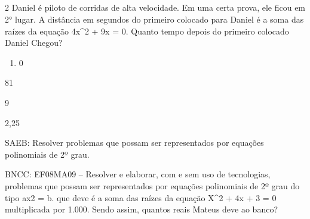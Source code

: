 \\
\\
\\
\\

% 
% 

\num{2} Daniel é piloto de corridas de alta velocidade. Em uma certa prova,
ele ficou em 2° lugar. A distância em segundos do primeiro colocado para
Daniel é a soma das raízes da equação 4x^2 + 9x = 0. Quanto tempo depois
do primeiro colocado Daniel Chegou?

\begin{enumerate}tlist
\item
  0
\end{enumerate}
\item 81
\item 9
\item 2,25

SAEB: Resolver problemas que possam ser representados por equações
polinomiais de 2º grau.

BNCC: EF08MA09 -- Resolver e elaborar, com e sem uso de tecnologias,
problemas que possam ser representados por equações polinomiais de 2º
grau do tipo ax2 = b.
que deve é a soma das raízes da equação X^2 + 4x + 3 = 0 multiplicada por
1.000. Sendo assim, quantos reais Mateus deve ao banco?

\\
\\
\\
\\
\\

